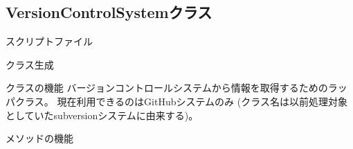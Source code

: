 
\subsection{VersionControlSystemクラス}
\label{subsec:VersionControlSystem}

\begin{Description}{スクリプトファイル}
\end{Description}

\medskip
\begin{Description}{クラス生成}
	\begin{Args}
	\end{Args}
\end{Description}

\medskip
\begin{Description}{クラスの機能}
	バージョンコントロールシステムから情報を取得するためのラッパクラス。
	現在利用できるのはGitHubシステムのみ
	(クラス名は以前処理対象としていたsubversionシステムに由来する)。
\end{Description}

\medskip
メソッドの機能

